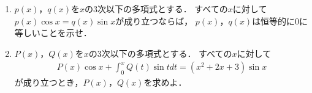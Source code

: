 \documentclass[../../main.tex]{subfiles}
\begin{document}
\begin{enumerate}
  \item $p(x)$，$q(x)$を$x$の3次以下の多項式とする．
    すべての$x$に対して$p(x)\cos x=q(x)\sin x$が成り立つならば，
    $p(x)$，$q(x)$は恒等的に0に等しいことを示せ．
  \item $P(x)$，$Q(x)$を$x$の3次以下の多項式とする．
    すべての$x$に対して
    \begin{align}
      P(x)\cos x+\int_0^xQ(t)\sin tdt=(x^2+2x+3)\sin x
    \end{align}
    が成り立つとき，$P(x)$，$Q(x)$を求めよ．
\end{enumerate}
\end{document}
